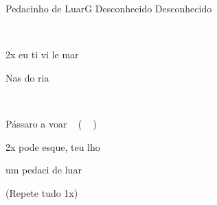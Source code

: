 \documentclass[a4,12pt,oneside]{book}
\newcommand{\RevDate}{\today}
\newcommand{\NotCCLIed}{\relax}
\begin{document}
\begin{song}{Pedacinho de Luar}{G}
  {Desconhecido}
  {Desconhecido}
  {}
  {\NotCCLIed}

	\renewcommand{\RevDate}{15 de maio de 2014}

	
	\ifChordBk
	{\vspace{-2em}\flushright{\Gchord \quad \Amchord \quad \Emchord \quad \Gschord \quad \Dschord \quad \Cchord}\\}
	
	\vspace{-1ex}
	\fi
	
	\begin{SBBracket}{2x}
		 eu ti vi le mar ~ 
		
		Nas  do ria
		
		 ~ 
		
		Pássaro a voar   ~ (  ~  )
	\end{SBBracket}

	\begin{SBBracket}{2x}
	  	 pode esque, teu lho
	  	
	  	 um pedaci de luar ~  ~ 
	\end{SBBracket}

	\begin{SBVerse*}
	  	(Repete tudo 1x)
	\end{SBVerse*}

	\begin{SBVerse*}
	\end{SBVerse*}
\end{song} 
\end{document}
